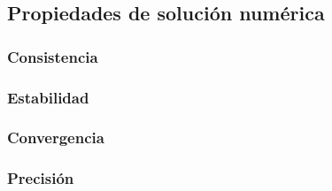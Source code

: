 
\subsection{Propiedades de solución numérica}
	\subsubsection{Consistencia}
	\subsubsection{Estabilidad}
	\subsubsection{Convergencia}
	\subsubsection{Precisión}